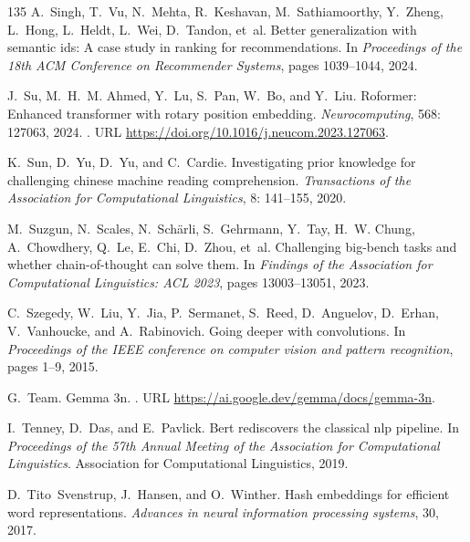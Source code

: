 \begin{thebibliography}{135}
A.~Singh, T.~Vu, N.~Mehta, R.~Keshavan, M.~Sathiamoorthy, Y.~Zheng, L.~Hong,
  L.~Heldt, L.~Wei, D.~Tandon, et~al.
\newblock Better generalization with semantic ids: A case study in ranking for
  recommendations.
\newblock In \emph{Proceedings of the 18th ACM Conference on Recommender
  Systems}, pages 1039--1044, 2024.

J.~Su, M.~H.~M. Ahmed, Y.~Lu, S.~Pan, W.~Bo, and Y.~Liu.
\newblock Roformer: Enhanced transformer with rotary position embedding.
\newblock \emph{Neurocomputing}, 568: 127063, 2024.
\newblock {}.
\newblock URL \url{https://doi.org/10.1016/j.neucom.2023.127063}.

K.~Sun, D.~Yu, D.~Yu, and C.~Cardie.
\newblock Investigating prior knowledge for challenging chinese machine reading
  comprehension.
\newblock \emph{Transactions of the Association for Computational Linguistics},
  8: 141--155, 2020.

M.~Suzgun, N.~Scales, N.~Sch{\"a}rli, S.~Gehrmann, Y.~Tay, H.~W. Chung,
  A.~Chowdhery, Q.~Le, E.~Chi, D.~Zhou, et~al.
\newblock Challenging big-bench tasks and whether chain-of-thought can solve
  them.
\newblock In \emph{Findings of the Association for Computational Linguistics:
  ACL 2023}, pages 13003--13051, 2023.

C.~Szegedy, W.~Liu, Y.~Jia, P.~Sermanet, S.~Reed, D.~Anguelov, D.~Erhan,
  V.~Vanhoucke, and A.~Rabinovich.
\newblock Going deeper with convolutions.
\newblock In \emph{Proceedings of the IEEE conference on computer vision and
  pattern recognition}, pages 1--9, 2015.

G.~Team.
\newblock Gemma 3n.
.
\newblock URL \url{https://ai.google.dev/gemma/docs/gemma-3n}.

I.~Tenney, D.~Das, and E.~Pavlick.
\newblock Bert rediscovers the classical nlp pipeline.
\newblock In \emph{Proceedings of the 57th Annual Meeting of the Association
  for Computational Linguistics}. Association for Computational Linguistics,
  2019.

D.~Tito~Svenstrup, J.~Hansen, and O.~Winther.
\newblock Hash embeddings for efficient word representations.
\newblock \emph{Advances in neural information processing systems}, 30, 2017.


\end{thebibliography}
